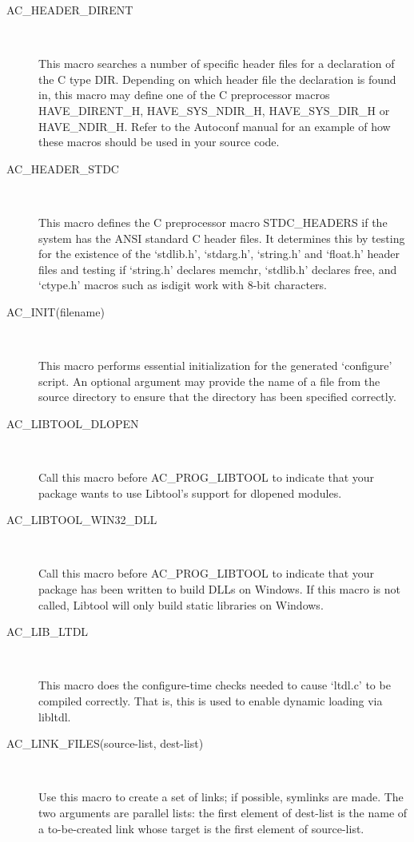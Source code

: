 \begin{description}
\item[AC\_{}HEADER\_{}DIRENT]
\

    This macro searches a number of specific header files for a declaration of the C type DIR. Depending on which header file the declaration is found in, this macro may define one of the C preprocessor macros HAVE\_{}DIRENT\_{}H, HAVE\_{}SYS\_{}NDIR\_{}H, HAVE\_{}SYS\_{}DIR\_{}H or HAVE\_{}NDIR\_{}H. Refer to the Autoconf manual for an example of how these macros should be used in your source code.

\item[AC\_{}HEADER\_{}STDC]
\

    This macro defines the C preprocessor macro STDC\_{}HEADERS if the system has the ANSI standard C header files. It determines this by testing for the existence of the `stdlib.h', `stdarg.h', `string.h' and `float.h' header files and testing if `string.h' declares memchr, `stdlib.h' declares free, and `ctype.h' macros such as isdigit work with 8-bit characters.

\item[AC\_{}INIT(filename)]
\

    This macro performs essential initialization for the generated `configure' script. An optional argument may provide the name of a file from the source directory to ensure that the directory has been specified correctly.

\item[AC\_{}LIBTOOL\_{}DLOPEN]
\

    Call this macro before AC\_{}PROG\_{}LIBTOOL to indicate that your package wants to use Libtool's support for dlopened modules.

\item[AC\_{}LIBTOOL\_{}WIN32\_{}DLL]
\

    Call this macro before AC\_{}PROG\_{}LIBTOOL to indicate that your package has been written to build DLLs on Windows. If this macro is not called, Libtool will only build static libraries on Windows.

\item[AC\_{}LIB\_{}LTDL]
\

    This macro does the configure-time checks needed to cause `ltdl.c' to be compiled correctly. That is, this is used to enable dynamic loading via libltdl.

\item[AC\_{}LINK\_{}FILES(source-list, dest-list)]
\

    Use this macro to create a set of links; if possible, symlinks are made. The two arguments are parallel lists: the first element of dest-list is the name of a to-be-created link whose target is the first element of source-list.


\end{description}
